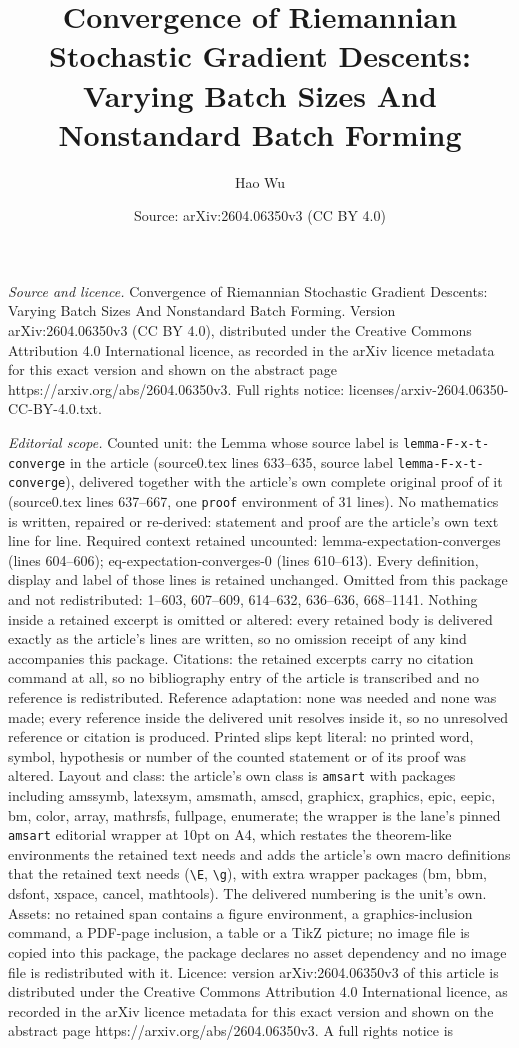 \documentclass[10pt,a4paper]{amsart}
\title[Convergence of Riemannian Stochastic Gradient Descents: Vary]{Convergence of Riemannian Stochastic Gradient Descents: Varying Batch Sizes And Nonstandard Batch Forming}
\author{Hao Wu}
\date{Source: arXiv:2604.06350v3 (CC BY 4.0)}
\begin{document}
\maketitle

\noindent\emph{Source and licence.} Convergence of Riemannian Stochastic Gradient Descents: Varying Batch Sizes And Nonstandard Batch Forming. Version arXiv:2604.06350v3 (CC BY 4.0), distributed under the Creative Commons Attribution 4.0 International licence, as recorded in the arXiv licence metadata for this exact version and shown on the abstract page https://arxiv.org/abs/2604.06350v3. Full rights notice: licenses/arxiv-2604.06350-CC-BY-4.0.txt.\par\smallskip

\noindent\textit{Editorial scope.} Counted unit: the Lemma whose source label is \texttt{lemma-F-x-t-converge} in the article (source0.tex lines 633--635, source label \texttt{lemma-F-x-t-converge}), delivered together with the article's own complete original proof of it (source0.tex lines 637--667, one \texttt{proof} environment of 31 lines). No mathematics is written, repaired or re-derived: statement and proof are the article's own text line for line. Required context retained uncounted: lemma-expectation-converges (lines 604--606); eq-expectation-converges-0 (lines 610--613). Every definition, display and label of those lines is retained unchanged. Omitted from this package and not redistributed: 1--603, 607--609, 614--632, 636--636, 668--1141. Nothing inside a retained excerpt is omitted or altered: every retained body is delivered exactly as the article's lines are written, so no omission receipt of any kind accompanies this package. Citations: the retained excerpts carry no citation command at all, so no bibliography entry of the article is transcribed and no reference is redistributed. Reference adaptation: none was needed and none was made; every reference inside the delivered unit resolves inside it, so no unresolved reference or citation is produced. Printed slips kept literal: no printed word, symbol, hypothesis or number of the counted statement or of its proof was altered. Layout and class: the article's own class is \texttt{amsart} with packages including amssymb, latexsym, amsmath, amscd, graphicx, graphics, epic, eepic, bm, color, array, mathrsfs, fullpage, enumerate; the wrapper is the lane's pinned \texttt{amsart} editorial wrapper at 10pt on A4, which restates the theorem-like environments the retained text needs and adds the article's own macro definitions that the retained text needs (\texttt{\textbackslash E}, \texttt{\textbackslash g}), with extra wrapper packages (bm, bbm, dsfont, xspace, cancel, mathtools). The delivered numbering is the unit's own. Assets: no retained span contains a figure environment, a graphics-inclusion command, a PDF-page inclusion, a table or a TikZ picture; no image file is copied into this package, the package declares no asset dependency and no image file is redistributed with it. Licence: version arXiv:2604.06350v3 of this article is distributed under the Creative Commons Attribution 4.0 International licence, as recorded in the arXiv licence metadata for this exact version and shown on the abstract page https://arxiv.org/abs/2604.06350v3. A full rights notice is 
\end{document}
